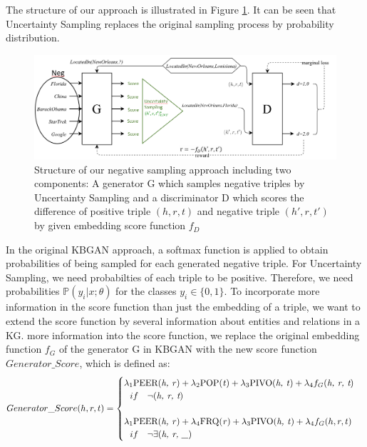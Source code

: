 The structure of our approach is illustrated in Figure \ref{fig:architecture}.
It can be seen that Uncertainty Sampling replaces the original sampling process by probability distribution.
\begin{figure}
    \centering
    \includegraphics[width=\textwidth]{figures/architecture.png}
    \caption{Structure of our negative sampling approach including two components:
    A generator G which samples negative triples by Uncertainty Sampling and a discriminator D which scores the difference of positive triple $(h,r,t)$ and negative triple $(h',r,t')$ by given embedding score function $f_D$}
    \label{fig:architecture}
\end{figure}
In the original \ac{KBGAN} approach, a softmax function is applied to obtain probabilities of being sampled for each generated negative triple.
For Uncertainty Sampling, we need probabilties of each triple to be positive. 
Therefore, we need probabilities $\mathds{P}(y_i | x; \theta)$ for the classes $y_i \in \{0, 1\}$.
To incorporate more information in the score function than just the embedding of a triple, we want to extend the score function by several information about entities and relations in a \ac{KG}.
more information into the score function, we replace the original embedding function $f_G$ of the generator G in \ac{KBGAN} with the new score function $Generator\_Score$, which is defined as:
\begin{equation}
    Generator\_Score(h, r, t)=
    \begin{cases}
         \lambda_1 \text{PEER(\textit{h, r})} + \lambda_2 \text{POP(\textit{t})} + \lambda_3 \text{PIVO(\textit{h, t})} + \lambda_4 f_G(\textit{h, r, t})
         \\ \ \ 
         if\ \ \ \neg(\textit{h, r, t})
         \\ \\
         \lambda_1 \text{PEER(\textit{h, r})} + \lambda_4 \text{FRQ(\textit{r})} + \lambda_3 \text{PIVO(\textit{h, t})} + \lambda_4 f_G(h, r, t)
         \\ \ \ 
         if\ \ \ \neg \exists (\textit{h, r, \_})
         \\
    \end{cases}
\end{equation}
